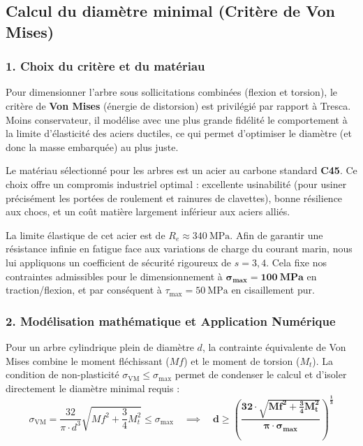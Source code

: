 \documentclass[11pt,a4paper]{article}
\begin{document}
\subsection{Calcul du diamètre minimal (Critère de Von Mises)}

\subsubsection*{1. Choix du critère et du matériau}

Pour dimensionner l'arbre sous sollicitations combinées (flexion et torsion), le critère de \textbf{Von Mises} (énergie de distorsion) est privilégié par rapport à Tresca. Moins conservateur, il modélise avec une plus grande fidélité le comportement à la limite d'élasticité des aciers ductiles, ce qui permet d'optimiser le diamètre (et donc la masse embarquée) au plus juste.

\begin{tcolorbox}[colback=BoxBg, colframe=TealAccent, arc=4pt, boxrule=1pt, title=\textbf{Matériau retenu : Acier C45}]
Le matériau sélectionné pour les arbres est un acier au carbone standard \textbf{C45}. Ce choix offre un compromis industriel optimal : excellente usinabilité (pour usiner précisément les portées de roulement et rainures de clavettes), bonne résilience aux chocs, et un coût matière largement inférieur aux aciers alliés. 

La limite élastique de cet acier est de $R_e \approx \qty{340}{\mega\pascal}$. Afin de garantir une résistance infinie en fatigue face aux variations de charge du courant marin, nous lui appliquons un coefficient de sécurité rigoureux de \textbf{$s = 3{,}4$}. Cela fixe nos contraintes admissibles pour le dimensionnement à $\mathbf{\sigma_{\max} = \qty{100}{\mega\pascal}}$ en traction/flexion, et par conséquent à $\tau_{\max} = \qty{50}{\mega\pascal}$ en cisaillement pur.
\end{tcolorbox}

\subsubsection*{2. Modélisation mathématique et Application Numérique}

Pour un arbre cylindrique plein de diamètre $d$, la contrainte équivalente de Von Mises combine le moment fléchissant ($Mf$) et le moment de torsion ($M_t$). La condition de non-plasticité $\sigma_{\text{VM}} \le \sigma_{\max}$ permet de condenser le calcul et d'isoler directement le diamètre minimal requis :
\[ \sigma_{\text{VM}} = \frac{32}{\pi \cdot d^3} \sqrt{Mf^2 + \frac{3}{4} M_t^2} \le \sigma_{\max} \quad \implies \quad \mathbf{d \ge \left( \frac{32 \cdot \sqrt{Mf^2 + \frac{3}{4} M_t^2}}{\pi \cdot \sigma_{\max}} \right)^{\frac{1}{3}}} \]
\end{document}
